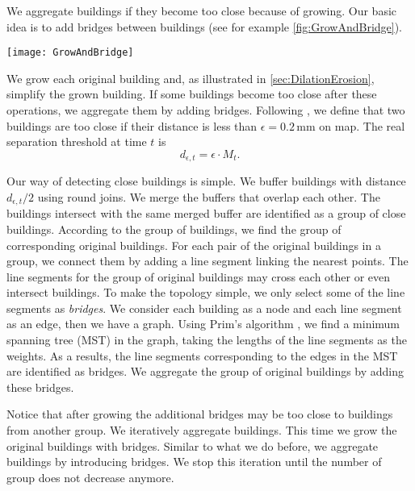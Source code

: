 We aggregate buildings if they become too close because of growing.
Our basic idea is to add bridges between buildings
(see for example \fig\ref{fig:GrowAndBridge}).

\begin{figure*}[tb]
	\centering
	\texttt{[image: GrowAndBridge]}
	\caption{Aggregate original buildings in the same group by introducing 
		bridges.
		Then grow the bridged buildings.}
	\label{fig:GrowAndBridge}
\end{figure*}


We grow each original building and, as illustrated in 
\sect\ref{sec:DilationErosion}, simplify the grown building.
If some buildings become too close after these operations,
we aggregate them by adding bridges.
Following \citet{Stoter2009}, 
we define that two buildings are too close if their distance is less than
$\epsilon= 0.2\,\mathrm{mm}$ on map.
The real separation threshold at time $t$ is
\begin{equation}
\label{eq:d_epsilont}
d_{\epsilon, t} = \epsilon \cdot M_t.
\end{equation}

Our way of detecting close buildings is simple.
We buffer buildings with distance $d_{\epsilon, t}/2$ using round joins.
We merge the buffers that overlap each other.
The buildings intersect with the same merged buffer 
are identified as a group of close buildings.
According to the group of buildings, 
we find the group of corresponding original buildings.
For each pair of the original buildings in a group,
we connect them by adding a line segment linking the nearest points.
The line segments for the group of original buildings may cross each other or 
even intersect buildings.
To make the topology simple, 
we only select some of the line segments as \emph{bridges}.  
We consider each building as a node and each line segment as an edge, 
then we have a graph.
Using Prim's algorithm \citep{Prim1957}, 
we find a minimum spanning tree (MST) in the graph,
taking the lengths of the line segments as the weights.
As a results, the line segments corresponding to the edges in the MST
are identified as bridges.
We aggregate the group of original buildings by adding these bridges.

Notice that after growing the additional bridges may be too close to buildings 
from another group.
We iteratively aggregate buildings.
This time we grow the original buildings with bridges.
Similar to what we do before, we aggregate buildings by introducing bridges.
We stop this iteration until the number of group does not decrease anymore.




